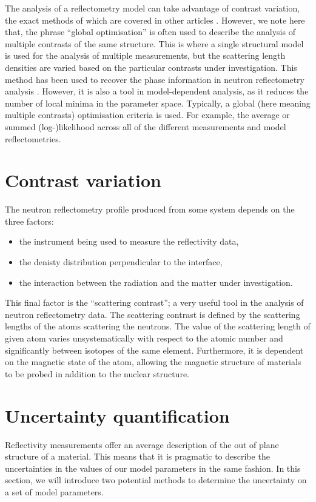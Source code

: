 \documentclass[
 reprint,
 superscriptaddress,
 amsmath,amssymb,
 aps,
]{revtex4-1}
\begin{document}
The analysis of a reflectometry model can take advantage of contrast variation, the exact methods of which are covered in other articles \cite{schurtenberger_contrast_2002}.
However, we note here that, the phrase ``global optimisation'' is often used to describe the analysis of multiple contrasts of the same structure.
This is where a single structural model is used for the analysis of multiple measurements, but the scattering length densities are varied based on the particular contrasts under investigation.
This method has been used to recover the phase information in neutron reflectometry analysis \cite{majkrzak_exact_1995,majkrzak_first_2000,majkrzak_phase_2003,koutsioubas_model_2019}.
However, it is also a tool in model-dependent analysis, as it reduces the number of local minima in the parameter space.
Typically, a global (here meaning multiple contrasts) optimisation criteria is used.
For example, the average or summed (log-)likelihood across all of the different measurements and model reflectometries.

\section{Contrast variation}
The neutron reflectometry profile produced from some system depends on the three factors: 
%
\begin{itemize}
    \item the instrument being used to measure the reflectivity data,
    \item the denisty distribution perpendicular to the interface,
    \item the interaction between the radiation and the matter under investigation.
\end{itemize}
%
This final factor is the ``scattering contrast''; a very useful tool in the analysis of neutron reflectometry data. 
The scattering contrast is defined by the scattering lengths of the atoms scattering the neutrons. 
The value of the scattering length of given atom varies unsystematically with respect to the atomic number and significantly between isotopes of the same element. 
Furthermore, it is dependent on the magnetic state of the atom, allowing the magnetic structure of materials to be probed in addition to the nuclear structure.
 




\section{Uncertainty quantification}
Reflectivity measurements offer an average description of the out of plane structure of a material.
This means that it is pragmatic to describe the uncertainties in the values of our model parameters in the same fashion.
In this section, we will introduce two potential methods to determine the uncertainty on a set of model parameters.
\end{document}
